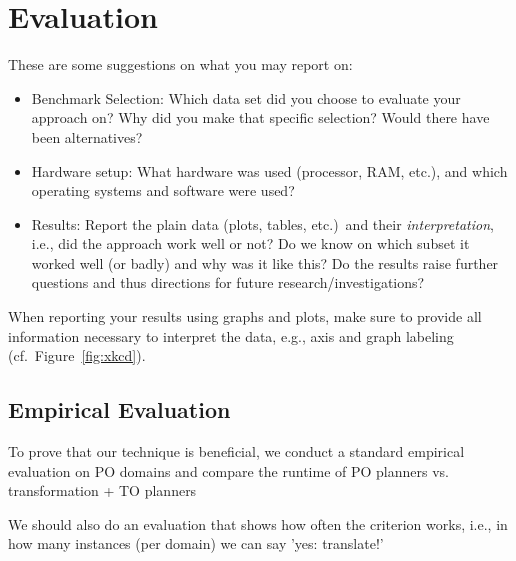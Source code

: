 \chapter{Evaluation}\label{chap:evaluation}


These are some suggestions on what you may report on:
\begin{itemize}
  \item Benchmark Selection: Which data set did you choose to evaluate your approach on? Why did you make that specific selection? Would there have been alternatives?
  \item Hardware setup: What hardware was used (processor, RAM, etc.), and which operating systems and software were used?
  \item Results: Report the plain data (plots, tables, etc.)\ and their \emph{interpretation}, i.e., did the approach work well or not? Do we know on which subset it worked well (or badly) and why was it like this? Do the results raise further questions and thus directions for future research/investigations?
\end{itemize}

When reporting your results using graphs and plots, make sure to provide all information necessary to interpret the data, e.g., axis and graph labeling (cf.~Figure~\ref{fig:xkcd}).



\section{Empirical Evaluation}
To prove that our technique is beneficial, we conduct a standard empirical evaluation on PO domains and compare the runtime of PO planners vs. transformation + TO planners

We should also do an evaluation that shows how often the criterion works, i.e., in how many instances (per domain) we can say 'yes: translate!'



